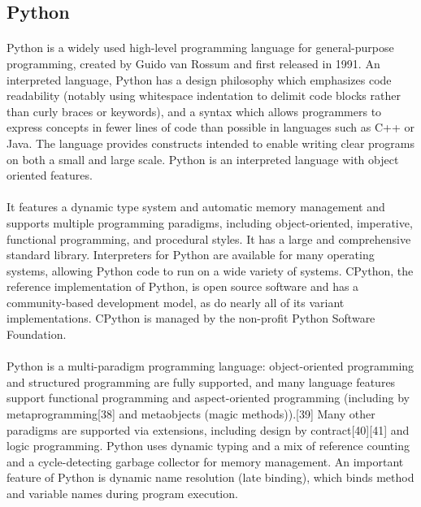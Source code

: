 \subsection{Python}
\paragraph{}
Python is a widely used high-level programming language for general-purpose programming, created by Guido van Rossum and first released in 1991. An interpreted language, Python has a design philosophy which emphasizes code readability (notably using whitespace indentation to delimit code blocks rather than curly braces or keywords), and a syntax which allows programmers to express concepts in fewer lines of code than possible in languages such as C++ or Java. The language provides constructs intended to enable writing clear programs on both a small and large scale. Python is an interpreted language with object oriented features.
\paragraph{}
It features a dynamic type system and automatic memory management and supports multiple programming paradigms, including object-oriented, imperative, functional programming, and procedural styles. It has a large and comprehensive standard library. Interpreters for Python are available for many operating systems, allowing Python code to run on a wide variety of systems. CPython, the reference implementation of Python, is open source software and has a community-based development model, as do nearly all of its variant implementations. CPython is managed by the non-profit Python Software Foundation.
\paragraph{}
Python is a multi-paradigm programming language: object-oriented programming and structured programming are fully supported, and many language features support functional programming and aspect-oriented programming (including by metaprogramming[38] and metaobjects (magic methods)).[39] Many other paradigms are supported via extensions, including design by contract[40][41] and logic programming. Python uses dynamic typing and a mix of reference counting and a cycle-detecting garbage collector for memory management. An important feature of Python is dynamic name resolution (late binding), which binds method and variable names during program execution.
